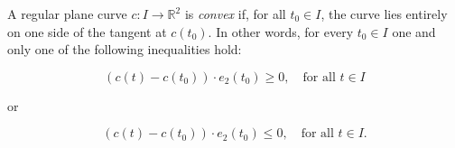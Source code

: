 A regular plane curve $c: I \to \mathbb{R}^2$ is \emph{convex} if, for all $t_0 \in I$, the curve lies entirely on one side of the tangent at $c(t_0)$. In other words, for every $t_0 \in I$ one and only one of the following inequalities hold:

$$(c(t) - c(t_0)) \cdot e_2(t_0) \geq 0, \quad \text{for all } t \in I$$

or

$$(c(t) - c(t_0)) \cdot e_2(t_0) \leq 0, \quad \text{for all } t \in I.$$
